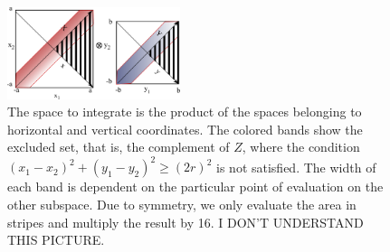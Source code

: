 \documentclass[superscriptaddress,pre,reprint,showpacs,onecolumn]{revtex4-1}
\begin{document}
\begin{figure}[h]
  \begin{center}
    \includegraphics[width=0.45\textwidth]{FigurasPerfectas/diagramintegra01.pdf}
  \end{center}
  \caption{The space to integrate is the product of the spaces
    belonging to horizontal and vertical coordinates. The colored
    bands show the excluded set, that is, the complement of $Z$, where the condition 
    $ (x_1-x_2)^2 + (y_1-y_2)^2 \ge (2r)^2 $ is not satisfied.
    The width of each band is dependent on the particular 
    point of evaluation
    on the other subspace. Due to 
    symmetry, we only evaluate the area in stripes and
    multiply the result by 16. I DON'T UNDERSTAND THIS PICTURE.
    \label{diagintegral01}  
    }
\end{figure}
\end{document}
